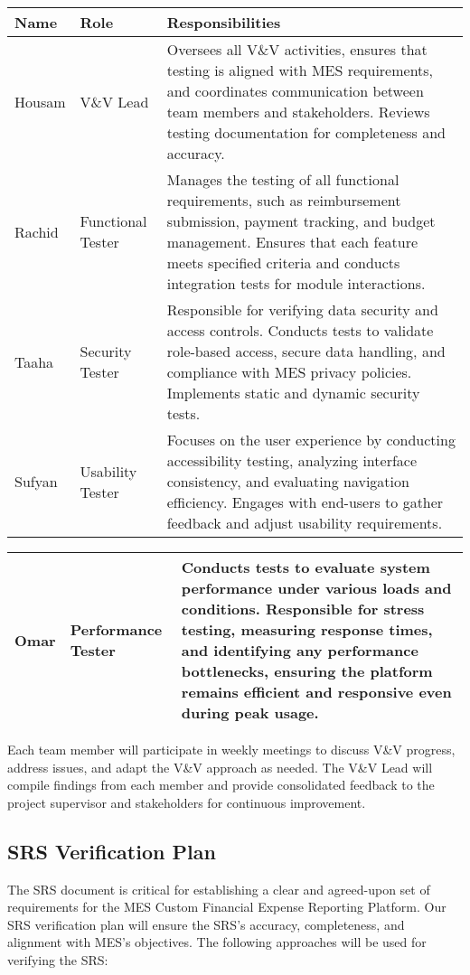 \documentclass[12pt, titlepage]{article}
\begin{document}
\begin{tabularx}{\textwidth}{|X|X|X|}
    \hline
    \textbf{Name} & \textbf{Role} & \textbf{Responsibilities} \\
    \hline
    Housam & V\&V Lead & Oversees all V\&V activities, ensures that testing is aligned with MES requirements, and coordinates communication between team members and stakeholders. Reviews testing documentation for completeness and accuracy. \\
    \hline
    Rachid & Functional Tester & Manages the testing of all functional requirements, such as reimbursement submission, payment tracking, and budget management. Ensures that each feature meets specified criteria and conducts integration tests for module interactions. \\
    \hline
    Taaha & Security Tester & Responsible for verifying data security and access controls. Conducts tests to validate role-based access, secure data handling, and compliance with MES privacy policies. Implements static and dynamic security tests. \\
    \hline
    Sufyan & Usability Tester & Focuses on the user experience by conducting accessibility testing, analyzing interface consistency, and evaluating navigation efficiency. Engages with end-users to gather feedback and adjust usability requirements. \\
    \hline
  \end{tabularx}

\pagebreak

  \begin{tabularx}{\textwidth}{|X|X|X|}
    Omar & Performance Tester & Conducts tests to evaluate system performance under various loads and conditions. Responsible for stress testing, measuring response times, and identifying any performance bottlenecks, ensuring the platform remains efficient and responsive even during peak usage. \\
    \hline
\end{tabularx}

Each team member will participate in weekly meetings to discuss V\&V progress, address issues, and adapt the V\&V approach as needed. The V\&V Lead will compile findings from each member and provide consolidated feedback to the project supervisor and stakeholders for continuous improvement.

\subsection{SRS Verification Plan}
The SRS document is critical for establishing a clear and agreed-upon set of requirements for the MES Custom Financial Expense Reporting Platform. Our SRS verification plan will ensure the SRS’s accuracy, completeness, and alignment with MES’s objectives. The following approaches will be used for verifying the SRS:
\end{document}
